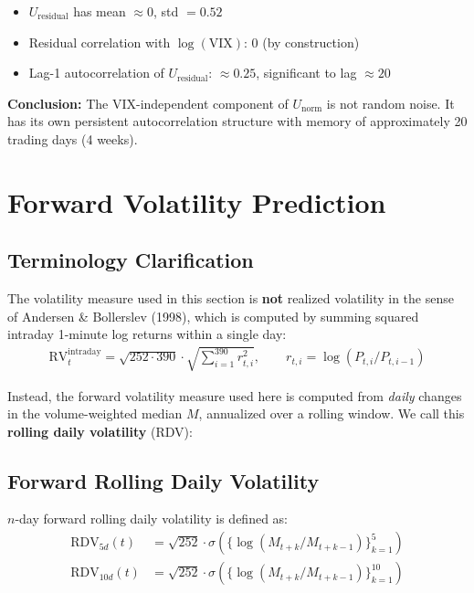 \documentclass[preprint,12pt]{elsarticle}
\begin{document}
\begin{itemize}
    \item $U_\mathrm{residual}$ has mean $\approx 0$, std $= 0.52$
    \item Residual correlation with $\log(\mathrm{VIX})$: 0 (by construction)
    \item Lag-1 autocorrelation of $U_\mathrm{residual}$: $\approx 0.25$, significant to lag $\approx 20$
\end{itemize}

\textbf{Conclusion:} The VIX-independent component of $U_\mathrm{norm}$ is not random noise. It has its own persistent autocorrelation structure with memory of approximately 20 trading days (4 weeks).

\section{Forward Volatility Prediction}

\subsection{Terminology Clarification}

The volatility measure used in this section is \textbf{not} realized volatility in the sense of Andersen \& Bollerslev (1998), which is computed by summing squared intraday 1-minute log returns within a single day:
\begin{align}
    \mathrm{RV}^{\mathrm{intraday}}_t = \sqrt{252 \cdot 390} \cdot \sqrt{\sum_{i=1}^{390} r_{t,i}^2}, \qquad r_{t,i} = \log(P_{t,i}/P_{t,i-1})
\end{align}

Instead, the forward volatility measure used here is computed from \textit{daily} changes in the volume-weighted median $M$, annualized over a rolling window. We call this \textbf{rolling daily volatility} (RDV):

\subsection{Forward Rolling Daily Volatility}

$n$-day forward rolling daily volatility is defined as:
\begin{align}
    \mathrm{RDV}_{5d}(t) &= \sqrt{252} \cdot \sigma\left(\{\log(M_{t+k}/M_{t+k-1})\}_{k=1}^{5}\right) \\
    \mathrm{RDV}_{10d}(t) &= \sqrt{252} \cdot \sigma\left(\{\log(M_{t+k}/M_{t+k-1})\}_{k=1}^{10}\right)
\end{align}
\end{document}
